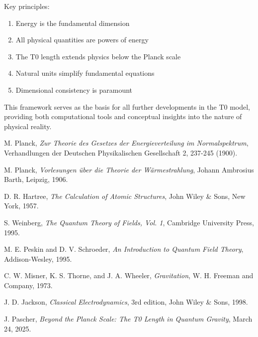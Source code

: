 \documentclass[11pt,a4paper]{article}
\begin{document}
	Key principles:
	\begin{enumerate}
		\item Energy is the fundamental dimension
		\item All physical quantities are powers of energy
		\item The T0 length extends physics below the Planck scale
		\item Natural units simplify fundamental equations
		\item Dimensional consistency is paramount
	\end{enumerate}
	
	This framework serves as the basis for all further developments in the T0 model, providing both computational tools and conceptual insights into the nature of physical reality.
	
	
	\begin{thebibliography}{10}
		
		M. Planck,
		\textit{Zur Theorie des Gesetzes der Energieverteilung im Normalspektrum},
		Verhandlungen der Deutschen Physikalischen Gesellschaft 2, 237-245 (1900).
		
		M. Planck,
		\textit{Vorlesungen über die Theorie der Wärmestrahlung},
		Johann Ambrosius Barth, Leipzig, 1906.
		
		D. R. Hartree,
		\textit{The Calculation of Atomic Structures},
		John Wiley \& Sons, New York, 1957.
		
		S. Weinberg,
		\textit{The Quantum Theory of Fields, Vol. 1},
		Cambridge University Press, 1995.
		
		M. E. Peskin and D. V. Schroeder,
		\textit{An Introduction to Quantum Field Theory},
		Addison-Wesley, 1995.
		
		C. W. Misner, K. S. Thorne, and J. A. Wheeler,
		\textit{Gravitation},
		W. H. Freeman and Company, 1973.
		
		J. D. Jackson,
		\textit{Classical Electrodynamics},
		3rd edition, John Wiley \& Sons, 1998.
		
		J. Pascher,
		\textit{Beyond the Planck Scale: The T0 Length in Quantum Gravity},
		March 24, 2025.
		
	\end{thebibliography}
	
\end{document}
